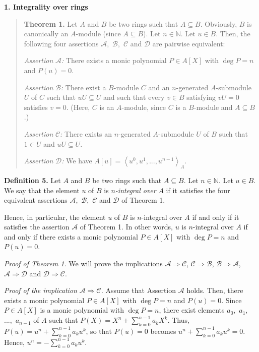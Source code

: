 \documentclass[12pt,final,notitlepage,onecolumn]{article}%
\begin{document}
\begin{center}
\color{blue} \textbf{1. Integrality over rings} \color{black}
\end{center}

\begin{quote}
\textbf{Theorem 1.} Let $A$ and $B$ be two rings such that $A\subseteq B$.
Obviously, $B$ is canonically an $A$-module (since $A\subseteq B$). Let
$n\in\mathbb{N}$. Let $u\in B$. Then, the following four assertions
$\mathcal{A},$ $\mathcal{B},$ $\mathcal{C}$ and $\mathcal{D}$ are pairwise equivalent:

\textit{Assertion }$\mathcal{A}$\textit{:} There exists a monic polynomial
$P\in A\left[  X\right]  $ with $\deg P=n$ and $P\left(  u\right)  =0$.

\textit{Assertion }$\mathcal{B}$\textit{:} There exist a $B$-module $C$ and an
$n$-generated $A$-submodule $U$ of $C$ such that $uU\subseteq U$ and such that
every $v\in B$ satisfying $vU=0$ satisfies $v=0$. (Here, $C$ is an $A$-module,
since $C$ is a $B$-module and $A\subseteq B$.)

\textit{Assertion }$\mathcal{C}$\textit{:} There exists an $n$-generated
$A$-submodule $U$ of $B$ such that $1\in U$ and $uU\subseteq U$.

\textit{Assertion }$\mathcal{D}$\textit{:} We have $A\left[  u\right]
=\left\langle u^{0},u^{1},...,u^{n-1}\right\rangle _{A}$.
\end{quote}

\textbf{Definition 5.} Let $A$ and $B$ be two rings such that $A\subseteq B$.
Let $n\in\mathbb{N}$. Let $u\in B$. We say that the element $u$ of $B$ is
$n$\textit{-integral over }$A$ if it satisfies the four equivalent assertions
$\mathcal{A},$ $\mathcal{B},$ $\mathcal{C}$ and $\mathcal{D}$ of Theorem 1.

Hence, in particular, the element $u$ of $B$ is $n$-integral over $A$ if and
only if it satisfies the assertion $\mathcal{A}$ of Theorem 1. In other words,
$u$ is $n$-integral over $A$ if and only if there exists a monic polynomial
$P\in A\left[  X\right]  $ with $\deg P=n$ and $P\left(  u\right)  =0$.

\textit{Proof of Theorem 1.} We will prove the implications $\mathcal{A}%
\Longrightarrow\mathcal{C}$, $\mathcal{C}\Longrightarrow\mathcal{B}$,
$\mathcal{B}\Longrightarrow\mathcal{A}$, $\mathcal{A}\Longrightarrow
\mathcal{D}$ and $\mathcal{D}\Longrightarrow\mathcal{C}$.

\textit{Proof of the implication }$\mathcal{A}\Longrightarrow\mathcal{C}%
$\textit{.} Assume that Assertion $\mathcal{A}$ holds. Then, there exists a
monic polynomial $P\in A\left[  X\right]  $ with $\deg P=n$ and $P\left(
u\right)  =0$. Since $P\in A\left[  X\right]  $ is a monic polynomial with
$\deg P=n$, there exist elements $a_{0},$ $a_{1},$ $...,$ $a_{n-1}$ of $A$
such that $P\left(  X\right)  =X^{n}+\sum\limits_{k=0}^{n-1}a_{k}X^{k}$. Thus,
$P\left(  u\right)  =u^{n}+\sum\limits_{k=0}^{n-1}a_{k}u^{k}$, so that
$P\left(  u\right)  =0$ becomes $u^{n}+\sum\limits_{k=0}^{n-1}a_{k}u^{k}=0$.
Hence, $u^{n}=-\sum\limits_{k=0}^{n-1}a_{k}u^{k}$.
\end{document}
